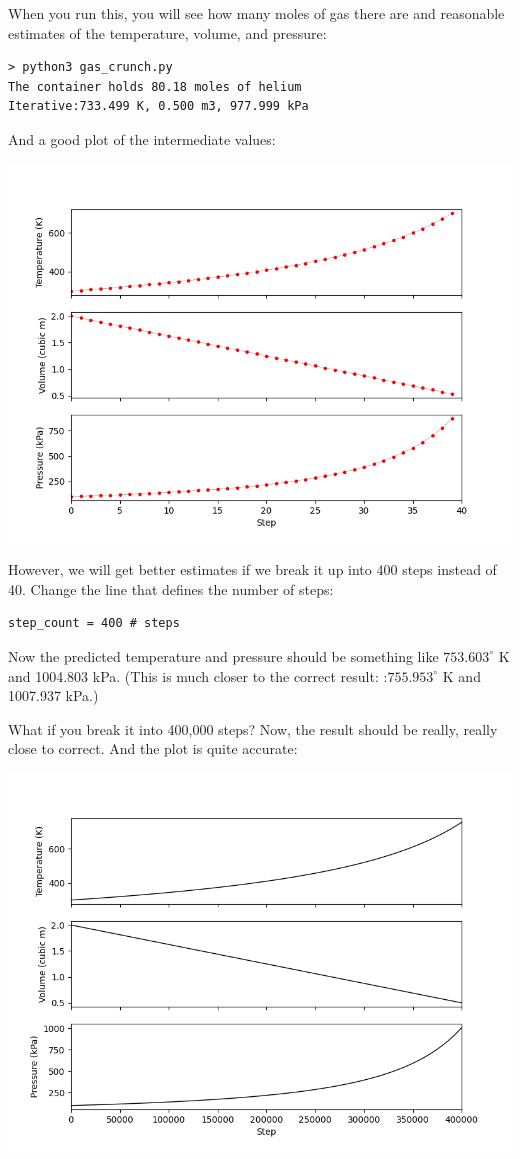 When you run this,  you will see how many moles of gas there are and reasonable estimates of the temperature,  volume,  and pressure:

\begin{Verbatim}
> python3 gas_crunch.py            
The container holds 80.18 moles of helium
Iterative:733.499 K, 0.500 m3, 977.999 kPa
\end{Verbatim}

And a good plot of the intermediate values:

\includegraphics[width=\textwidth]{chunkplot1.png}

However, we will get better estimates if we break it up into 400 steps instead of 40. Change the line that defines the number of steps:

\begin{Verbatim}
step_count = 400 # steps
\end{Verbatim}

Now the predicted temperature and pressure should be something like $753.603^\circ$  K and 1004.803 kPa.   (This is much closer to the correct result: :$755.953^\circ$ K and 1007.937 kPa.)

What if you break it into 400,000 steps?  Now, the result should be really, really close to correct.  And the plot is quite accurate:

\includegraphics[width=\textwidth]{chunkplot2.png}

